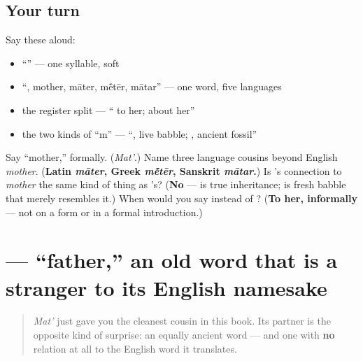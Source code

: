 \subsection*{Your turn}
Say these aloud:

\begin{itemize}
\raggedright
  \item \textquotedblleft{}\textquotedblright{} — one syllable, soft 
  \item \textquotedblleft{}, mother, māter, m\'{\={e}}tēr, mātar\textquotedblright{} — one word, five languages
  \item the register split — \textquotedblleft{} to her;  about her\textquotedblright{}
  \item the two kinds of \textquotedblleft{}m\textquotedblright{} — \textquotedblleft{}, live babble; , ancient fossil\textquotedblright{}
\end{itemize}

\begin{tcolorbox}[breakable,colback=teal!4,colframe=teal!35!black,title={Before you move on}]
Say \textquotedblleft{}mother,\textquotedblright{} formally. (\emph{Mat'}.) Name three language cousins beyond English \emph{mother}. (\textbf{Latin \emph{māter}, Greek \emph{m\'{\={e}}tēr}, Sanskrit \emph{mātar}.}) Is \emph{}'s connection to \emph{mother} the same kind of thing as \emph{}'s? (\textbf{No} — \emph{} is true inheritance; \emph{} is fresh babble that merely resembles it.) When would you say \emph{} instead of \emph{}? (\textbf{To her, informally} — not on a form or in a formal introduction.)
\end{tcolorbox}
\section[\texorpdfstring{\ru{отец} (atéts)}{отец (atéts)}]{ — \textquotedblleft{}father,\textquotedblright{} an old word that is a stranger to its English namesake}

\label{lesson:RU-C12-otets}



\begin{quote}
\emph{Mat'} just gave you the cleanest cousin in this book. Its partner is the opposite kind of surprise: an equally ancient word — and one with \textbf{no} relation at all to the English word it translates.
\end{quote}

